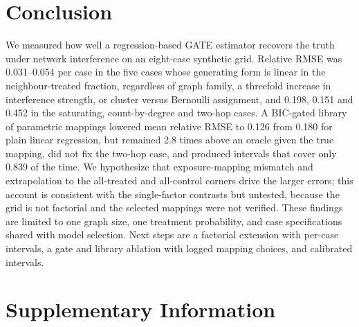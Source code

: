 \documentclass{article}
\begin{document}
\section{Conclusion}
We measured how well a regression-based GATE estimator recovers the truth under network interference on an eight-case synthetic grid. Relative RMSE was 0.031--0.054 per case in the five cases whose generating form is linear in the neighbour-treated fraction, regardless of graph family, a threefold increase in interference strength, or cluster versus Bernoulli assignment, and 0.198, 0.151 and 0.452 in the saturating, count-by-degree and two-hop cases. A BIC-gated library of parametric mappings lowered mean relative RMSE to 0.126 from 0.180 for plain linear regression, but remained 2.8 times above an oracle given the true mapping, did not fix the two-hop case, and produced intervals that cover only 0.839 of the time. We hypothesize that exposure-mapping mismatch and extrapolation to the all-treated and all-control corners drive the larger errors; this account is consistent with the single-factor contrasts but untested, because the grid is not factorial and the selected mappings were not verified. These findings are limited to one graph size, one treatment probability, and case specifications shared with model selection. Next steps are a factorial extension with per-case intervals, a gate and library ablation with logged mapping choices, and calibrated intervals.

\clearpage



\clearpage
\appendix
\section{Supplementary Information}
\end{document}

